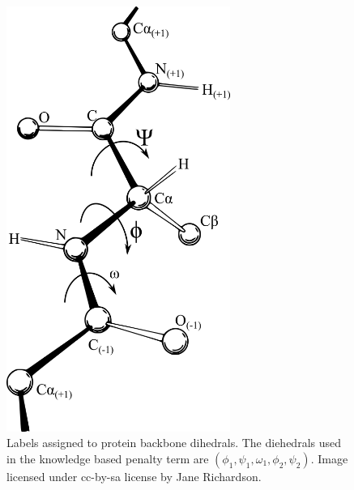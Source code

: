 \begin{figure}[h]
    \centering
    \includegraphics[width=0.65\textwidth,height=0.45\textheight,keepaspectratio]{figures/backbone_labels.png}
    \caption{Labels assigned to protein backbone dihedrals.
The diehedrals used in the knowledge based penalty term are $(\phi_{1}, \psi_{1}, \omega_{1}, \phi_{2}, \psi_{2})$.
Image licensed under cc-by-sa license by Jane Richardson.}
    \label{figure:backbone_labels}
\end{figure}

